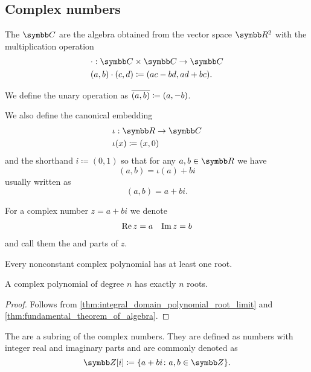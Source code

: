 \subsection{Complex numbers}\label{subsec:complex_numbers}

\begin{definition}\label{def:complex_numbers}
  The  \( \Co \) are the algebra obtained from the vector space \( \R^2 \) with the multiplication operation
  \begin{align*}
    &\cdot: \Co \times \Co \to \Co \\
    &(a, b) \cdot (c, d) \coloneqq (ac - bd, ad + bc).
  \end{align*}

  We define the unary  operation as \( \overline{(a, b)} \coloneqq (a, -b) \).

  We also define the canonical embedding
  \begin{align*}
    &\iota: \R \to \Co \\
    &\iota(x) \coloneqq (x, 0)
  \end{align*}
  and the shorthand \( i \coloneqq (0, 1) \) so that for any \( a, b \in \R \) we have
  \begin{equation*}
    (a, b) = \iota(a) + bi
  \end{equation*}
  usually written as
  \begin{equation*}
    (a, b) = a + bi.
  \end{equation*}

  For a complex number \( z = a + bi \) we denote
  \begin{align*}
    \operatorname{Re} z = a && \operatorname{Im} z = b
  \end{align*}
  and call them the  and  parts of \( z \).
\end{definition}

\begin{theorem}\label{thm:fundamental_theorem_of_algebra}
  Every nonconstant complex polynomial has at least one root.
\end{theorem}

\begin{corollary}\label{thm:complex_polynomials_have_n_roots}
  A complex polynomial of degree \( n \) has exactly \( n \) roots.
\end{corollary}
\begin{proof}
  Follows from \cref{thm:integral_domain_polynomial_root_limit} and \cref{thm:fundamental_theorem_of_algebra}.
\end{proof}

\begin{definition}\label{def:gaussian_integers}
  The  are a subring of the complex numbers. They are defined as numbers with integer real and imaginary parts and are commonly denoted as
  \begin{equation*}
    \Z[i] \coloneqq \{ a + bi \colon a, b \in \Z \}.
  \end{equation*}
\end{definition}
